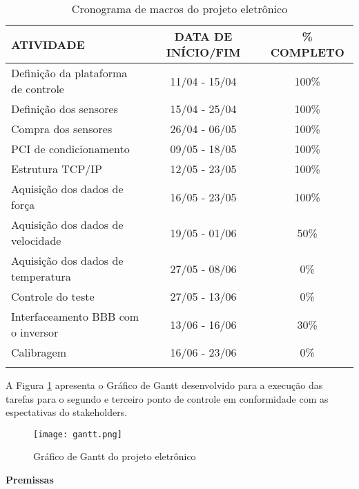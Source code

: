 	\begin{table}[!h]
	\centering
	\caption{Cronograma de macros do projeto eletrônico}
	\begin{tabular}{ l c c }
	\hline
	\textbf{ATIVIDADE}	&	\textbf{DATA DE INÍCIO/FIM} &	\textbf{\% COMPLETO}\\
	\hline
	Definição da plataforma de controle		&	11/04 - 15/04  & 100\% \\
	\hline
	Definição dos sensores					&	15/04 - 25/04  & 100\% \\
	\hline
	Compra dos sensores						&	26/04 - 06/05  & 100\% \\
	\hline
	PCI de condicionamento					&	09/05 - 18/05  & 100\% \\
	\hline
	Estrutura TCP/IP						&	12/05 - 23/05  & 100\% \\
	\hline
	Aquisição dos dados de força			&	16/05 - 23/05  & 100\% \\
	\hline
	Aquisição dos dados de velocidade		&	19/05 - 01/06  & 50\% \\
	\hline
	Aquisição dos dados de temperatura		&	27/05 - 08/06  & 0\% \\
	\hline
	Controle do teste						&	27/05 - 13/06  & 0\% \\
	\hline
	Interfaceamento BBB com o inversor		&	13/06 - 16/06  & 30\% \\
	\hline
	Calibragem								&	16/06 - 23/06  & 0\% \\
	\hline

	\label{cronogramaeletronica}
	\end{tabular}
	\end{table}

	A Figura \ref{gantt} apresenta o Gráfico de Gantt desenvolvido para a execução das tarefas para o segundo e terceiro ponto de controle em conformidade com as espectativas do stakeholders.
	\newpage
	\begin{figure}[!h]
		\centering
		\texttt{[image: gantt.png]}
		\caption{Gráfico de Gantt do projeto eletrônico}
		\label{gantt}
	\end{figure}

	\textbf{Premissas}

